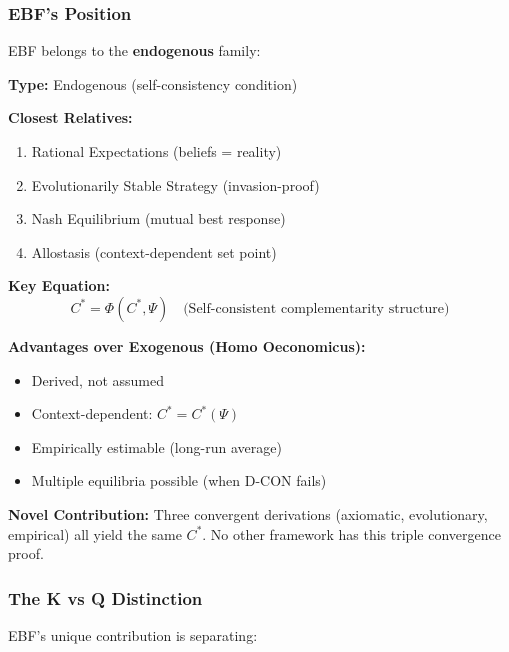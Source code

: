 \subsubsection{EBF's Position}

EBF belongs to the \textbf{endogenous} family:

\begin{tcolorbox}[colback=green!5!white, colframe=green!75!black,
    title=\textbf{EBF Paradigm Position}]

\textbf{Type:} Endogenous (self-consistency condition)

\textbf{Closest Relatives:}
\begin{enumerate}[nosep]
    \item Rational Expectations (beliefs = reality)
    \item Evolutionarily Stable Strategy (invasion-proof)
    \item Nash Equilibrium (mutual best response)
    \item Allostasis (context-dependent set point)
\end{enumerate}

\textbf{Key Equation:}
\begin{equation}
C^* = \Phi(C^*, \Psi) \quad \text{(Self-consistent complementarity structure)}
\end{equation}

\textbf{Advantages over Exogenous (Homo Oeconomicus):}
\begin{itemize}[nosep]
    \item Derived, not assumed
    \item Context-dependent: $C^* = C^*(\Psi)$
    \item Empirically estimable (long-run average)
    \item Multiple equilibria possible (when D-CON fails)
\end{itemize}

\textbf{Novel Contribution:}
Three convergent derivations (axiomatic, evolutionary, empirical) all yield
the same $C^*$. No other framework has this triple convergence proof.

\end{tcolorbox}

\subsubsection{The K vs Q Distinction}

EBF's unique contribution is separating:


